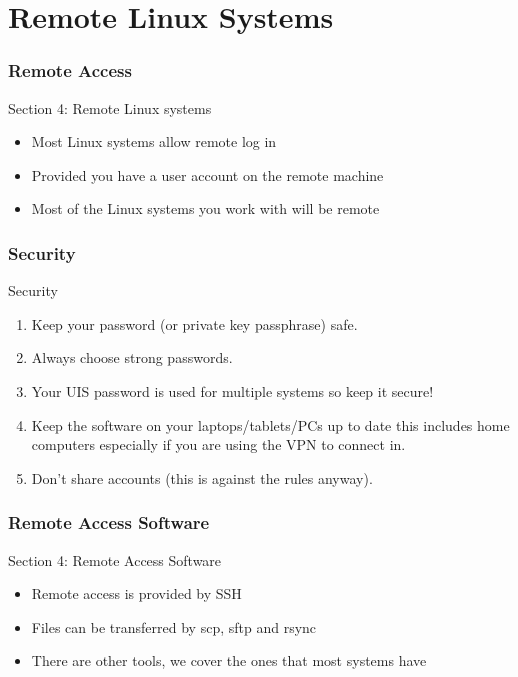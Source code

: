 \part{Remote Linux Systems}
\begin{frame}
\partpage
\end{frame}

\section{Remote Access}
\begin{frame}{Section 4: Remote Linux systems}
\begin{itemize}
\item Most Linux systems allow remote log in
\item Provided you have a user account on the remote machine
\item Most of the Linux systems you work with will be remote
\end{itemize}
\end{frame}

\section{Security}
\begin{frame}{Security}
\begin{enumerate}
\item{\alert{Keep your password (or private key passphrase) safe.}}
\pause
\item{\alert{Always choose strong passwords.}}
\pause
\item{\alert{Your UIS password is used for multiple systems so keep it secure!}}
\pause
\item{Keep the software on your laptops/tablets/PCs up to date this includes home computers especially if you are using the VPN to connect in.}
\pause
\item{Don't share accounts (this is against the rules anyway).}
\end{enumerate}
\end{frame}

\section{Remote Access Software}
\begin{frame}{Section 4: Remote Access Software}
\begin{itemize}
\item Remote access is provided by SSH
\item Files can be transferred by scp, sftp and rsync
\item There are other tools, we cover the ones that most systems have
\end{itemize}
\end{frame}

